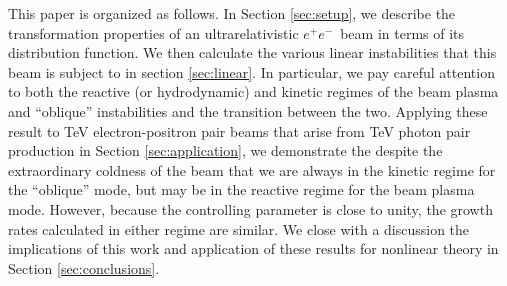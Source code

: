 \documentclass[usenatbib,iop,apj]{emulateapj}
\newcommand\ac[1]{{\color{green} \bf #1}} %
\newcommand\bmath[1] {\mbox{\boldmath$\rm #1$}}
\newcommand{\epm}{\ensuremath{e^+e^-}}
\begin{document}
This paper is organized as follows.  In Section \ref{sec:setup}, we describe the transformation properties of an ultrarelativistic \epm\ beam in terms of its distribution function.  We then calculate the various linear instabilities that this beam is subject to in section \ref{sec:linear}.  In particular, we pay careful attention to both the reactive (or hydrodynamic) and kinetic regimes of the beam plasma and ``oblique'' instabilities and the transition between the two.  Applying these result to TeV electron-positron pair beams that arise from TeV photon pair production in Section \ref{sec:application},
we demonstrate the despite the extraordinary coldness of the beam that we are always in the kinetic regime for the ``oblique'' mode, but may be in the reactive regime for the beam plasma mode.  However, because the controlling parameter is close to unity, the growth rates calculated in either regime are similar.  We close with a discussion the implications of this work and application of these results for nonlinear theory in Section \ref{sec:conclusions}.

\end{document}
